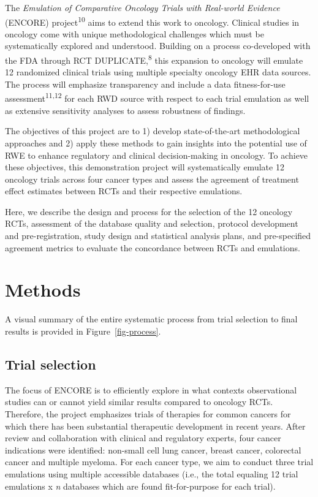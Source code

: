 \documentclass[
  letterpaper,
  DIV=11,
  numbers=noendperiod]{scrartcl}
\begin{document}
The \emph{Emulation of Comparative Oncology Trials with Real-world
Evidence} (ENCORE) project\textsuperscript{10} aims to extend this work
to oncology. Clinical studies in oncology come with unique
methodological challenges which must be systematically explored and
understood. Building on a process co-developed with the FDA through RCT
DUPLICATE,\textsuperscript{8} this expansion to oncology will emulate 12
randomized clinical trials using multiple specialty oncology EHR data
sources. The process will emphasize transparency and include a data
fitness-for-use assessment\textsuperscript{11,12} for each RWD source
with respect to each trial emulation as well as extensive sensitivity
analyses to assess robustness of findings.

The objectives of this project are to 1) develop state-of-the-art
methodological approaches and 2) apply these methods to gain insights
into the potential use of RWE to enhance regulatory and clinical
decision-making in oncology. To achieve these objectives, this
demonstration project will systematically emulate 12 oncology trials
across four cancer types and assess the agreement of treatment effect
estimates between RCTs and their respective emulations.

Here, we describe the design and process for the selection of the 12
oncology RCTs, assessment of the database quality and selection,
protocol development and pre-registration, study design and statistical
analysis plans, and pre-specified agreement metrics to evaluate the
concordance between RCTs and emulations.

\section{Methods}\label{methods}

A visual summary of the entire systematic process from trial selection
to final results is provided in Figure~\ref{fig-process}.

\subsection{Trial selection}\label{trial-selection}

The focus of ENCORE is to efficiently explore in what contexts
observational studies can or cannot yield similar results compared to
oncology RCTs. Therefore, the project emphasizes trials of therapies for
common cancers for which there has been substantial therapeutic
development in recent years. After review and collaboration with
clinical and regulatory experts, four cancer indications were
identified: non-small cell lung cancer, breast cancer, colorectal cancer
and multiple myeloma. For each cancer type, we aim to conduct three
trial emulations using multiple accessible databases (i.e., the total
equaling 12 trial emulations x \emph{n} databases which are found
fit-for-purpose for each trial).
\end{document}
